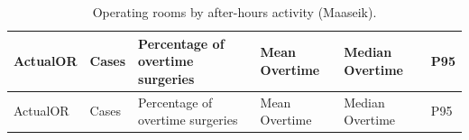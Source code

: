 \documentclass[
]{article}
\begin{document}
\begin{longtable}[]{@{}
  >{\centering\arraybackslash}p{}
  >{\centering\arraybackslash}p{}
  >{\centering\arraybackslash}p{}
  >{\centering\arraybackslash}p{}
  >{\centering\arraybackslash}p{}
  >{\centering\arraybackslash}p{}@{}}
\caption{Operating rooms by after-hours activity (Maaseik).
\label{tab:overtime_or}}\tabularnewline
\toprule\noalign{}
\begin{minipage}[b]{\linewidth}\centering
ActualOR
\end{minipage} & \begin{minipage}[b]{\linewidth}\centering
Cases
\end{minipage} & \begin{minipage}[b]{\linewidth}\centering
Percentage of overtime surgeries
\end{minipage} & \begin{minipage}[b]{\linewidth}\centering
Mean Overtime
\end{minipage} & \begin{minipage}[b]{\linewidth}\centering
Median Overtime
\end{minipage} & \begin{minipage}[b]{\linewidth}\centering
P95
\end{minipage} \\
\midrule\noalign{}
\endfirsthead
\toprule\noalign{}
\begin{minipage}[b]{\linewidth}\centering
ActualOR
\end{minipage} & \begin{minipage}[b]{\linewidth}\centering
Cases
\end{minipage} & \begin{minipage}[b]{\linewidth}\centering
Percentage of overtime surgeries
\end{minipage} & \begin{minipage}[b]{\linewidth}\centering
Mean Overtime
\end{minipage} & \begin{minipage}[b]{\linewidth}\centering
Median Overtime
\end{minipage} & \begin{minipage}[b]{\linewidth}\centering
P95
\end{minipage} \\

\end{longtable}
\end{document}
